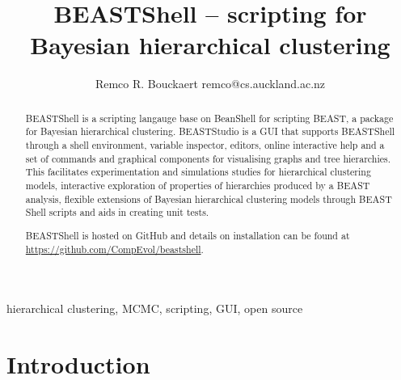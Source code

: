 \documentclass[twoside,11pt]{article}
\begin{document}
\title{BEASTShell -- scripting for Bayesian hierarchical clustering}
\author{\name Remco R. Bouckaert \email remco@cs.auckland.ac.nz}
\editor{---}
\maketitle

\begin{abstract}
BEASTShell is a scripting langauge base on BeanShell for scripting BEAST,
a package for Bayesian hierarchical clustering. BEASTStudio is a GUI that 
supports BEASTShell through a shell environment, variable inspector, editors, 
online interactive help and a set of commands and graphical components for 
visualising graphs and tree hierarchies.
This facilitates experimentation and simulations studies for hierarchical clustering models,
interactive exploration of properties of hierarchies produced by a BEAST 
analysis, flexible extensions of Bayesian hierarchical clustering models 
through BEAST Shell scripts and aids in creating unit tests.

BEASTShell is hosted on GitHub and details on installation can be found at
\url{https://github.com/CompEvol/beastshell}.
\end{abstract}
\begin{keywords}
  hierarchical clustering, MCMC, scripting, GUI, open source
\end{keywords}

\section{Introduction}
\end{document}
